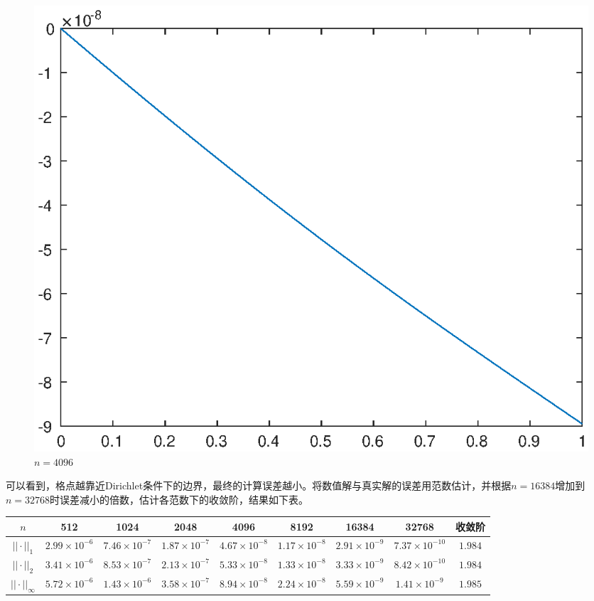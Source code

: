\documentclass[lang=cn,10pt]{elegantbook}
\begin{document}
\begin{figure}[H]
\begin{minipage}[t]{0.24\linewidth}
    \caption*{$n=2048$}
  \end{minipage}
  \begin{minipage}[t]{0.24\linewidth}
    \centering
    \includegraphics[width=0.8\linewidth]{figure/1-3-4.eps}
    \caption*{$n=4096$}
  \end{minipage}
\end{figure}

可以看到，格点越靠近Dirichlet条件下的边界，最终的计算误差越小。将数值解与真实解的误差用范数估计，并根据$n=16384$增加到$n=32768$时误差减小的倍数，估计各范数下的收敛阶，结果如下表。

\begin{table}[H]
  \centering
  \small
  \begin{tabular}{c|ccccccc|c}
  \textbf{$n$}        & 512                 & 1024                 & 2048                 & 4096                 & 8192                 & 16384                & 32768                & 收敛阶 \\ \hline
  $||\cdot||_1$      & $2.99\times 10^{-6}$ & $7.46\times 10^{-7}$ & $1.87\times 10^{-7}$ & $4.67\times 10^{-8}$ & $1.17\times 10^{-8}$ & $2.91\times 10^{-9}$ & $7.37\times 10^{-10}$ & $1.984$\\
  $||\cdot||_2$      & $3.41\times 10^{-6}$ & $8.53\times 10^{-7}$ & $2.13\times 10^{-7}$ & $5.33\times 10^{-8}$ & $1.33\times 10^{-8}$ & $3.33\times 10^{-9}$ & $8.42\times 10^{-10}$ & $1.984$\\
  $||\cdot||_\infty$ & $5.72\times 10^{-6}$ & $1.43\times 10^{-6}$ & $3.58\times 10^{-7}$ & $8.94\times 10^{-8}$ & $2.24\times 10^{-8}$ & $5.59\times 10^{-9}$ & $1.41\times 10^{-9}$ & $1.985$
  \end{tabular}
\end{table}
\end{document}
